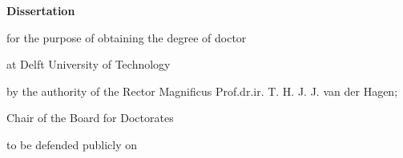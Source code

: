 \begin{titlepage}

%
%
%
%
%
%
%
%

\begin{center}


\vspace*{2\bigskipamount}

{\makeatletter
\titlestyle\bfseries\LARGE\@title
\makeatother}

{\makeatletter
\ifx\@subtitle\undefined\else
    \bigskip
    \titlefont\titleshape\Large\@subtitle
\fi
\makeatother}

\vfill


{\Large\titlefont\bfseries Dissertation}

\bigskip
\bigskip

for the purpose of obtaining the degree of doctor

at Delft University of Technology

by the authority of the Rector Magnificus Prof.dr.ir. T. H. J. J. van der Hagen;

Chair of the Board for Doctorates

to be defended publicly on 


\end{center}
\end{titlepage}
